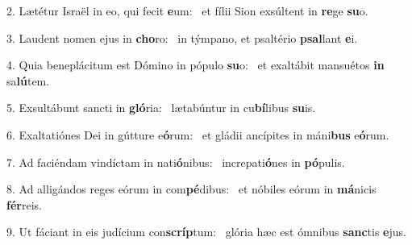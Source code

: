 2. Lætétur Israël in eo, qui fecit \textbf{e}um: \ast\  et fílii Sion exsúltent in \textbf{re}ge \textbf{su}o.\

3. Laudent nomen ejus in \textbf{cho}ro: \ast\  in týmpano, et psaltério \textbf{psal}lant \textbf{e}i.\

4. Quia beneplácitum est Dómino in pópulo \textbf{su}o: \ast\  et exaltábit mansuétos \textbf{in} sa\textbf{lú}tem.\

5. Exsultábunt sancti in \textbf{gló}ria: \ast\  lætabúntur in cu\textbf{bí}libus \textbf{su}is.\

6. Exaltatiónes Dei in gútture e\textbf{ó}rum: \ast\  et gládii ancípites in máni\textbf{bus} e\textbf{ó}rum.\

7. Ad faciéndam vindíctam in nati\textbf{ó}nibus: \ast\  increpati\textbf{ó}nes in \textbf{pó}pulis.\

8. Ad alligándos reges eórum in com\textbf{pé}dibus: \ast\  et nóbiles eórum in \textbf{má}nicis \textbf{fér}reis.\

9. Ut fáciant in eis judícium con\textbf{scríp}tum: \ast\  glória hæc est ómnibus \textbf{sanc}tis \textbf{e}jus.\

